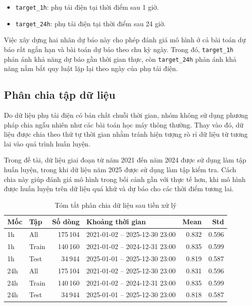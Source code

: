 \begin{itemize}
\item \texttt{target\_1h}: phụ tải điện tại thời điểm sau 1 giờ.
\item \texttt{target\_24h}: phụ tải điện tại thời điểm sau 24 giờ.
\end{itemize}

Việc xây dựng hai nhãn dự báo này cho phép đánh giá mô hình ở cả bài toán dự báo rất ngắn hạn và bài toán dự báo theo chu kỳ ngày. Trong đó, \texttt{target\_1h} phản ánh khả năng dự báo gần thời gian thực, còn \texttt{target\_24h} phản ánh khả năng nắm bắt quy luật lặp lại theo ngày của phụ tải điện.

\subsection{Phân chia tập dữ liệu}

Do dữ liệu phụ tải điện có bản chất chuỗi thời gian, nhóm không sử dụng phương pháp chia ngẫu nhiên như các bài toán học máy thông thường. Thay vào đó, dữ liệu được chia theo thứ tự thời gian nhằm tránh hiện tượng rò rỉ dữ liệu từ tương lai vào quá trình huấn luyện.

Trong đề tài, dữ liệu giai đoạn từ năm 2021 đến năm 2024 được sử dụng làm tập huấn luyện, trong khi dữ liệu năm 2025 được sử dụng làm tập kiểm tra. Cách chia này giúp đánh giá mô hình trong bối cảnh gần với thực tế hơn, khi mô hình được huấn luyện trên dữ liệu quá khứ và dự báo cho các thời điểm tương lai.

\begin{table}[H]
\centering
\caption{Tóm tắt phân chia dữ liệu sau tiền xử lý}
\small
\begin{tabularx}{\textwidth}{|p{1.4cm}|p{1.8cm}|r|X|r|r|}
\hline
\textbf{Mốc} & \textbf{Tập} & \textbf{Số dòng} & \textbf{Khoảng thời gian} & \textbf{Mean} & \textbf{Std} \\
\hline
1h & All & 175\,104 & 2021-01-02 -- 2025-12-30 23:00 & 0.832 & 0.596 \\
\hline
1h & Train & 140\,160 & 2021-01-02 -- 2024-12-31 23:00 & 0.835 & 0.599 \\
\hline
1h & Test & 34\,944 & 2025-01-01 -- 2025-12-30 23:00 & 0.819 & 0.587 \\
\hline
24h & All & 175\,104 & 2021-01-02 -- 2025-12-30 23:00 & 0.831 & 0.596 \\
\hline
24h & Train & 140\,160 & 2021-01-02 -- 2024-12-31 23:00 & 0.835 & 0.599 \\
\hline
24h & Test & 34\,944 & 2025-01-01 -- 2025-12-30 23:00 & 0.818 & 0.587 \\
\hline
\end{tabularx}
\end{table}

